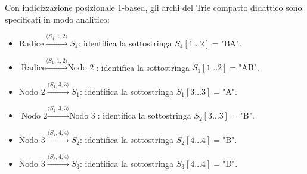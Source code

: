Con indicizzazione posizionale 1-based, gli archi del Trie compatto didattico sono specificati in modo analitico:
\begin{itemize}
  \item $\text{Radice} \xrightarrow{\langle S_4, 1, 2 \rangle} S_4$: identifica la sottostringa $S_4[1 \dots 2] = \text{"BA"}$.
  \item $\text{Radice} \xrightarrow{\langle S_1, 1, 2 \rangle} \text{Nodo 2}$: identifica la sottostringa $S_1[1 \dots 2] = \text{"AB"}$.
  \item $\text{Nodo 2} \xrightarrow{\langle S_1, 3, 3 \rangle} S_1$: identifica la sottostringa $S_1[3 \dots 3] = \text{"A"}$.
  \item $\text{Nodo 2} \xrightarrow{\langle S_2, 3, 3 \rangle} \text{Nodo 3}$: identifica la sottostringa $S_2[3 \dots 3] = \text{"B"}$.
  \item $\text{Nodo 3} \xrightarrow{\langle S_2, 4, 4 \rangle} S_2$: identifica la sottostringa $S_2[4 \dots 4] = \text{"B"}$.
  \item $\text{Nodo 3} \xrightarrow{\langle S_3, 4, 4 \rangle} S_3$: identifica la sottostringa $S_3[4 \dots 4] = \text{"D"}$.
\end{itemize}

